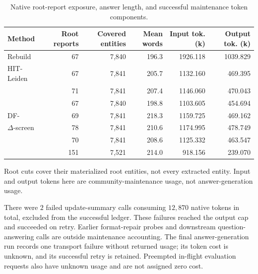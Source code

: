 \begin{table}[tb]\centering
\caption{Native root-report exposure, answer length, and successful maintenance token components.}
\label{tab:case-study-exposure}
\footnotesize
\setlength{\tabcolsep}{0.25em}
\begin{tabular*}{\linewidth}{@{\extracolsep{\fill}}lrrrrr@{}}
\toprule
Method & Root reports & Covered entities & Mean words & Input tok. (k) & Output tok. (k) \\
\midrule
Rebuild & 67 & 7,840 & 196.3 & 1926.118 & 1039.829 \\
HIT-Leiden & 67 & 7,841 & 205.7 & 1132.160 & 469.395 \\
\DynaMo{} & 71 & 7,841 & 207.4 & 1146.060 & 470.043 \\
\QCA{} & 67 & 7,840 & 198.8 & 1103.605 & 454.694 \\
DF-\Louvain{} & 69 & 7,841 & 218.3 & 1159.725 & 469.162 \\
$\Delta$-screen & 78 & 7,841 & 210.6 & 1174.995 & 478.749 \\
\Batch{} & 70 & 7,841 & 208.6 & 1125.332 & 463.547 \\
\DyLo{} & 151 & 7,521 & 214.0 & 918.156 & 239.070 \\
\bottomrule
\end{tabular*}
\par\smallskip\raggedright
Root cuts cover their materialized root entities, not every extracted entity. Input and output tokens here are community-maintenance usage, not answer-generation usage.
\end{table}

There were $2$ failed update-summary calls consuming
$12,870$ native tokens in total, excluded from the successful ledger.
These failures reached the output cap and succeeded on retry.
Earlier format-repair probes and downstream question-answering calls are
outside maintenance accounting. The final answer-generation run records one
transport failure without returned usage; its token cost is unknown, and its
successful retry is retained. Preempted in-flight evaluation requests also
have unknown usage and are not assigned zero cost.

